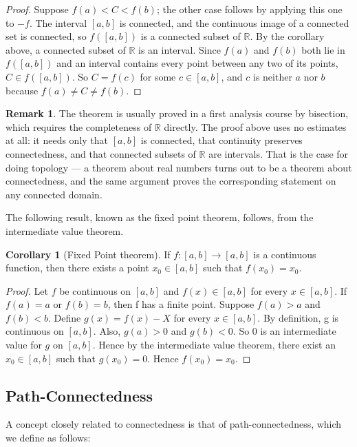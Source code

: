 \documentclass[11pt,a4paper]{article}
\theoremstyle{definition}
\newtheorem{coro}[thm]{Corollary}
\newtheorem*{remark}{Remark}
\begin{document}
\begin{proof}
Suppose $f(a)<C<f(b)$; the other case follows by applying this one to $-f$.
The interval $[a,b]$ is connected, and the continuous image of a connected set is
connected, so $f\left([a,b]\right)$ is a connected subset of $\mathbb{R}$. By the
corollary above, a connected subset of $\mathbb{R}$ is an interval. Since
$f(a)$ and $f(b)$ both lie in $f\left([a,b]\right)$ and an interval contains
every point between any two of its points, $C \in f\left([a,b]\right)$. So
$C=f(c)$ for some $c\in[a,b]$, and $c$ is neither $a$ nor $b$ because
$f(a)\neq C \neq f(b)$.
\end{proof}

\begin{remark}
The theorem is usually proved in a first analysis course by bisection, which
requires the completeness of $\mathbb{R}$ directly. The proof above uses no
estimates at all: it needs only that $[a,b]$ is connected, that continuity
preserves connectedness, and that connected subsets of $\mathbb{R}$ are
intervals. That is the case for doing topology --- a theorem about real numbers
turns out to be a theorem about connectedness, and the same argument proves the
corresponding statement on any connected domain.
\end{remark}

The following result, known as the fixed point theorem, follows, from the intermediate value theorem.



\begin{coro}[Fixed Point theorem]
If $f:[a,b]\rightarrow [a,b]$ is a continuous function, then there exists a point $x_0\in [a,b]$ such that $f(x_0)=x_0$.
\end{coro}

\begin{proof}
Let $f$ be continuous on $[a,b]$ and $f(x)\in [a,b]$ for every $x\in [a,b]$.
If $f(a)=a$ or $f(b)=b$, then f has a finite point. Suppose $f(a)>a$ and $f(b)<b$. Define $g(x)=f(x)-X$ for every $x\in [a,b]$. By definition, g is continuous on $[a,b]$. Also, $g(a)>0$ and $g(b)<0$. So 0 is an intermediate value for $g$ on $[a,b]$. Hence by the intermediate value theorem, there exist an $x_0\in [a,b]$ such that $g(x_0)=0$. Hence $f(x_0)=x_0$.
\end{proof}






\subsection{Path-Connectedness}
A concept closely related to connectedness is that of path-connectedness, which we define as follows:
\end{document}
